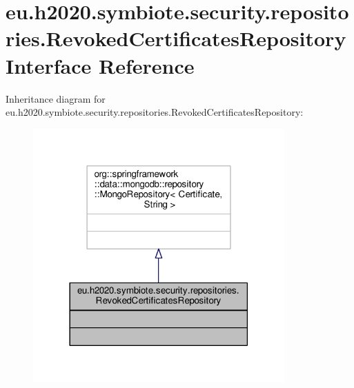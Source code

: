 \hypertarget{interfaceeu_1_1h2020_1_1symbiote_1_1security_1_1repositories_1_1RevokedCertificatesRepository}{}\section{eu.\+h2020.\+symbiote.\+security.\+repositories.\+Revoked\+Certificates\+Repository Interface Reference}
\label{interfaceeu_1_1h2020_1_1symbiote_1_1security_1_1repositories_1_1RevokedCertificatesRepository}


Inheritance diagram for eu.\+h2020.\+symbiote.\+security.\+repositories.\+Revoked\+Certificates\+Repository\+:
\nopagebreak
\begin{figure}[H]
\begin{center}
\leavevmode
\includegraphics[width=273pt]{interfaceeu_1_1h2020_1_1symbiote_1_1security_1_1repositories_1_1RevokedCertificatesRepository__inherit__graph}
\end{center}
\end{figure}


